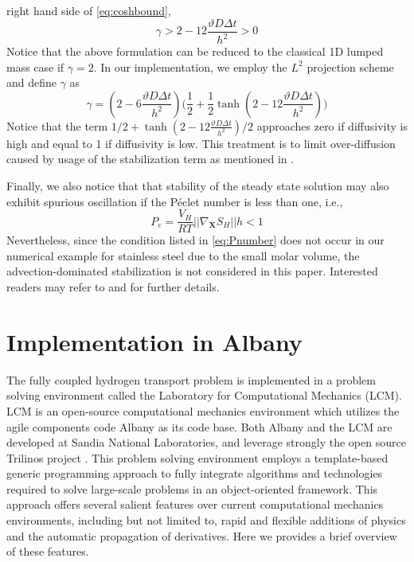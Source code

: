 \documentclass[10pt]{elsarticle}
\newcommand{\mbs}[1]{\boldsymbol{#1}}
\def\bs{{\mbs{s}}} \def\bt{{\mbs{t}}} \def\bu{{\mbs{u}}}
\def\bs{\boldsymbol}
\begin{document}
right hand side of \eqref{eq:coshbound},
\begin{equation}
  \label{eq:stabL2bound} 
  \gamma > 2 -12 \frac{\vartheta D \Delta t}{h^{2}} > 0 
\end{equation}
Notice that the above formulation can be reduced to the
  classical 1D lumped mass case if $\gamma = 2$. In our implementation, 
  we employ the $L^{2}$ projection scheme and define $\gamma$ as
\begin{equation}
  \label{eq:arctang} 
  \gamma = (2 - 6 \frac{\vartheta D \Delta t}{h^{2}}) \Big(\frac{1}{2} + \frac{1}{2} \tanh( 2 - 12 \frac{\vartheta D \Delta t}{h^{2}}) \Big) 
\end{equation}
Notice that the term $1/2 + \tanh( 2 - 12 \frac{\vartheta D \Delta
  t}{h^{2}})/2 $ approaches zero if diffusivity is high and equal to 1
if diffusivity is low.  This treatment is to limit over-diffusion
caused by usage of the stabilization term as mentioned in
\citep{Sun:2013}. 

Finally, we also notice that  that stability of the steady state solution may also exhibit spurious oscillation if the P\'{e}clet number is less than one, i.e.,
\begin{equation}
\label{eq:Pnumber} P_{e}  = \frac{V_{H}}{RT} || \nabla_{\bs{X}}  S_{H} || h < 1
\end{equation} 
Nevertheless, since the condition listed in \eqref{eq:Pnumber} does not occur in our
numerical example for stainless steel due to the small molar volume, the
advection-dominated stabilization is not considered in this paper. Interested readers
may refer to \citep{Onate:2000} and \citep{Tezduyar:1986} for further details. 

\appendix
\section{Implementation in Albany}
\label{sec:appendixImplementation}
The fully coupled hydrogen transport  problem is implemented
in a problem solving environment called the Laboratory for Computational Mechanics
(LCM). LCM is an open-source computational mechanics environment
which utilizes the agile components code Albany \citep{Salinger:2010, Salinger:2013}
as its code base. Both Albany and the LCM are developed at Sandia
National Laboratories, and leverage strongly the open source
Trilinos project \citep{Heroux:2005}. This problem solving
environment employs a template-based generic programming approach
to fully integrate algorithms and technologies required to solve
large-scale problems in an object-oriented framework. This
approach offers several salient features over current
computational mechanics environments, including but not limited
to, rapid and flexible additions of physics and the automatic
propagation of derivatives. Here we provides a brief overview
of these features.
\end{document}

